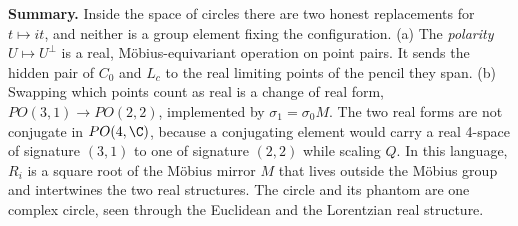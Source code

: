 \noindent\textbf{Summary.} Inside the space of circles there are two honest replacements for $t\mapsto it$, and neither is a group element fixing the configuration.
(a) The \emph{polarity} $U\mapsto U^\perp$ is a real, Möbius-equivariant operation on point pairs. It sends the hidden pair of $C_0$ and $L_c$ to the real limiting points of the pencil they span.
(b) Swapping which points count as real is a change of real form, $PO(3,1)\to PO(2,2)$, implemented by $\sigma_1=\sigma_0M$. The two real forms are not conjugate in $PO(4,\C)$, because a conjugating element would carry a real 4-space of signature $(3,1)$ to one of signature $(2,2)$ while scaling $Q$. In this language, $R_i$ is a square root of the Möbius mirror $M$ that lives outside the Möbius group and intertwines the two real structures. The circle and its phantom are one complex circle, seen through the Euclidean and the Lorentzian real structure.

